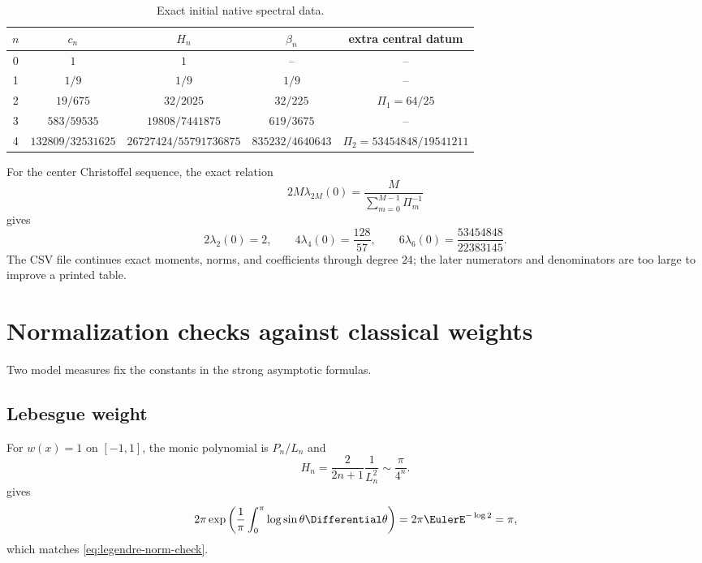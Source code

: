 \documentclass[11pt,oneside]{article}
\theoremstyle{definition}
\theoremstyle{remark}
\numberwithin{equation}{section}
\begin{document}
\begin{table}[htbp]
\centering
\caption{Exact initial native spectral data.}
\label{tab:exact-low-degree}
\begin{tabular}{@{}ccccc@{}}
\toprule
$n$ & $c_n$ & $H_n$ & $\beta_n$ & extra central datum\\
\midrule
0 & $1$ & $1$ & -- & --\\
1 & $1/9$ & $1/9$ & $1/9$ & --\\
2 & $19/675$ & $32/2025$ & $32/225$ &
 $\Pi_1=64/25$\\
3 & $583/59535$ & $19808/7441875$ & $619/3675$ & --\\
4 & $132809/32531625$ & $26727424/55791736875$ &
 $835232/4640643$ & $\Pi_2=53454848/19541211$\\
\bottomrule
\end{tabular}
\end{table}

For the center Christoffel sequence, the exact relation
\begin{equation}
 2M\lambda_{2M}(0)
 =\frac{M}{\sum_{m=0}^{M-1}\Pi_m^{-1}}
 \label{eq:appendix-harmonic}
\end{equation}
gives
\begin{equation}
 2\lambda_2(0)=2,
 \qquad
 4\lambda_4(0)=\frac{128}{57},
 \qquad
 6\lambda_6(0)=\frac{53454848}{22383145}.
 \label{eq:appendix-center-values}
\end{equation}
The CSV file continues exact moments, norms, and coefficients through degree
$24$; the later numerators and denominators are too large to improve a printed
table.

\section{Normalization checks against classical weights}
\label{app:normalizations}

Two model measures fix the constants in the strong asymptotic formulas.

\subsection{Lebesgue weight}
For $w(x)=1$ on $[-1,1]$, the monic polynomial is
$P_n/L_n$ and
\begin{equation}
 H_n=\frac{2}{2n+1}\frac1{L_n^2}
 \sim\frac{\pi}{4^n}.
 \label{eq:legendre-norm-check}
\end{equation}
 gives
\begin{equation}
 2\pi\exp\left(\frac1\pi\int_0^\pi\log\sin\theta\Differential\theta\right)
 =2\pi\EulerE^{-\log2}=\pi,
 \label{eq:szego-constant-check}
\end{equation}
which matches \cref{eq:legendre-norm-check}.
\end{document}

